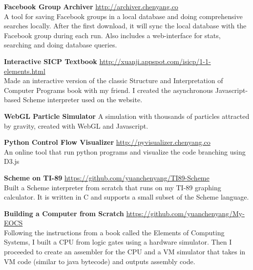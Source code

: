 \documentclass[9pt]{article}
\newenvironment{changemargin}[2]{%
  \begin{list}{}{%
      \setlength{\topsep}{0pt}%
      \setlength{\leftmargin}{#1}%
      \setlength{\rightmargin}{#2}%
      \setlength{\listparindent}{\parindent}%
      \setlength{\itemindent}{\parindent}%
      \setlength{\parsep}{\parskip}%
    }%
  \item[]}{\end{list}
}
\newenvironment{body} {
  \vspace*{-16pt}
  \begin{changemargin}{-0.25in}{-0.5in}
  }
  {\end{changemargin}
}
\begin{document}
\begin{body}
  \vspace{14pt}

  \textbf{Facebook Group Archiver} \hfill \url{http://archiver.chenyang.co}\\
  A tool for saving Facebook groups in a local database and doing comprehensive searches locally. After the first download, it will sync the local database with the Facebook group during each run. Also includes a web-interface for stats, searching and doing database queries. \\
  \medskip

  \textbf{Interactive SICP Textbook} \hfill \url{http://xuanji.appspot.com/isicp/1-1-elements.html}\\
  Made an interactive version of the classic Structure and Interpretation of Computer Programs book with my friend. I created the asynchronous Javascript-based Scheme interpreter used on the website.\\
  \medskip

   \textbf{WebGL Particle Simulator} \hfill %
   A simulation with thousands of particles attracted by gravity, created with  WebGL and Javascript. \\
   \medskip

  \textbf{Python Control Flow Visualizer} \hfill \url{http://pyvisualizer.chenyang.co}\\
  An online tool that run python programs and visualize the code branching using D3.js\\
  \medskip

  \textbf{Scheme on TI-89} \hfill \url{https://github.com/yuanchenyang/TI89-Scheme}\\
  Built a Scheme interpreter from scratch that runs on my TI-89 graphing calculator. It is written in C and supports a small subset of the Scheme language.\\
  \medskip

  \textbf{Building a Computer from Scratch} \hfill \url{https://github.com/yuanchenyang/My-EOCS}\\
  Following the instructions from a book called the Elements of Computing Systems, I built a CPU from logic gates using a hardware simulator. Then I proceeded to create an assembler for the CPU and a VM simulator that takes in VM code (similar to java bytecode) and outputs assembly code. \\
  \medskip


\end{body}
\end{document}
